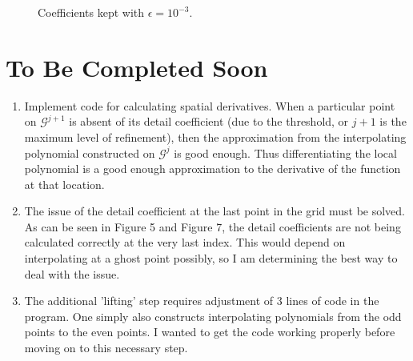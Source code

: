 \documentclass[11pt]{article}
\begin{document}
\begin{figure}[H]
	\center
	
	\caption{Coefficients kept with $\epsilon=10^{-3}$.}
\end{figure}
\newpage
\section{To Be Completed Soon}
\begin{enumerate}
	\item Implement code for calculating spatial derivatives. When a particular point on $\mathcal{G}^{j+1}$ is absent 
		of its detail coefficient (due to the threshold, or $j+1$ is the maximum level of refinement), then the approximation 
		from the interpolating polynomial constructed on $\mathcal{G}^j$ is good enough. Thus differentiating the local
		polynomial is a good enough approximation to the derivative of the function at that location.
	\item The issue of the detail coefficient at the last point in the grid must be solved. As can be seen in Figure 5 and 
		Figure 7, the detail coefficients are not being calculated correctly at the very last index. This would depend on 
		interpolating at a ghost point possibly, so I am determining the best way to deal with the issue.
	\item The additional 'lifting' step requires adjustment of 3 lines of code in the program. One simply also constructs
		interpolating polynomials from the odd points to the even points. I wanted to get the code working properly before 
		moving on to this necessary step. 
\end{enumerate}
\end{document}
